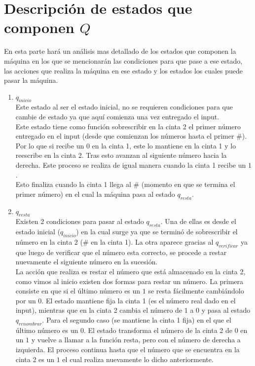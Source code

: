 \documentclass[12pt]{article}
\begin{document}
\section*{Descripción de estados que componen $Q$}
En esta parte hará un análisis mas detallado de los estados que componen la máquina en los que se mencionarán las condiciones para que pase a ese estado, las acciones que realiza la máquina en ese estado y los estados los cuales puede pasar la máquina.
\begin{enumerate}
    \item {\large $q_{inicio}$} \vspace{0.2cm}\\
    Este estado al ser el estado inicial, no se requieren condiciones para que cambie de estado ya que aquí comienza una vez entregado el input. \\
    Este estado tiene como función sobrescribir en la cinta 2 el primer número entregado en el input (desde que comienzan los números hasta el primer \#). Por lo que si recibe un $0$ en la cinta 1, este lo mantiene en la cinta 1 y lo reescribe en la cinta 2. Tras esto avanzan al siguiente número hacia la derecha. Este proceso se realiza de igual manera cuando la cinta 1 recibe un $1$. \\
    Esto finaliza cuando la cinta 1 llega al \# (momento en que se termina el primer número) en el cual la máquina pasa al estado  $q_{resta}$.\\
    \item {\large $q_{resta}$} \vspace{0.2cm}\\
    Existen 2 condiciones para pasar al estado $q_{resta}$. Una de ellas es desde el estado inicial ($q_{inicio}$) en la cual surge ya que se terminó de sobrescribir el número en la cinta 2 (\# en la cinta 1). La otra aparece gracias al $ q_{verificar}$ ya que luego de verificar que el número esta correcto, se procede a restar nuevamente el siguiente número en la sucesión. \\
    La acción que realiza es restar el número que está almacenado en la cinta 2, como vimos al inicio existen dos formas para restar un número. La primera consiste en que si el último número es un $1$ se resta fácilmente cambiándolo por un $0$. El estado mantiene fija la cinta 1 (es el número real dado en el input), mientras que en la cinta 2 cambia el número de $1$ a $0$ y pasa al estado $q_{renombrar}$. Para el segundo caso (se mantiene la cinta 1 fija) en el que el último número es un $0$. El estado transforma el número de la cinta 2 de $0$ en un $1$ y vuelve a llamar a la función resta, pero con el número de derecha a izquierda. El proceso continua hasta que el número que se encuentra en la cinta 2 es un $1$ el cual realiza nuevamente lo dicho anteriormente. \\

\end{enumerate}
\end{document}
